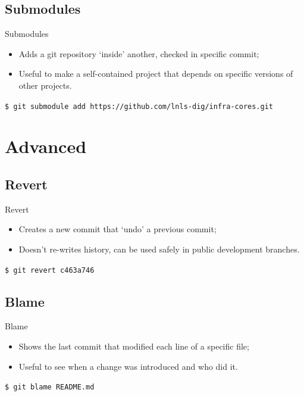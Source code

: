 \documentclass{beamer}
\begin{document}
\subsection{Submodules}
\begin{frame}{Submodules}
  \begin{itemize}
    \item Adds a git repository `inside' another, checked in specific commit;
    \item Useful to make a self-contained project that depends on specific versions of other projects.
  \end{itemize}
  \begin{block}{}
    \texttt{\$ git submodule add https://github.com/lnls-dig/infra-cores.git}
  \end{block}
\end{frame}

\section{Advanced}

\subsection{Revert}
\begin{frame}{Revert}
  \begin{itemize}
    \item Creates a new commit that `undo' a previous commit;
    \item Doesn't re-writes history, can be used safely in public development branches.
  \end{itemize}
  \begin{block}{}
    \texttt{\$ git revert c463a746}
  \end{block}
\end{frame}

\subsection{Blame}
\begin{frame}{Blame}
  \begin{itemize}
    \item Shows the last commit that modified each line of a specific file;
    \item Useful to see when a change was introduced and who did it.
  \end{itemize}
  \begin{block}{}
    \texttt{\$ git blame README.md}
  \end{block}
\end{frame}
\end{document}
